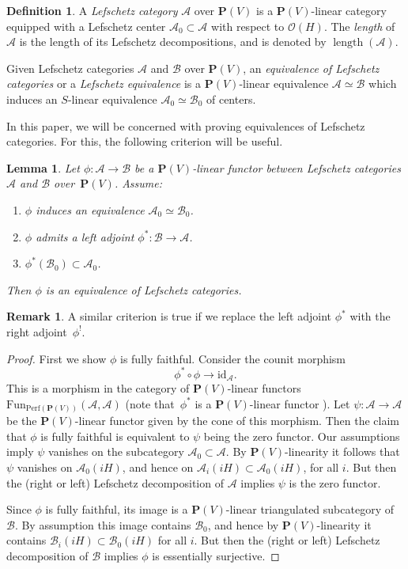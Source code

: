 \documentclass[11pt, reqno]{amsart}
\numberwithin{equation}{section}
\theoremstyle{plain}
\newtheorem{lemma}[theorem]{Lemma}
\theoremstyle{definition}
\newtheorem{definition}[theorem]{Definition}
\newtheorem{remark}[theorem]{Remark}
\newcommand{\Perf}{\mathrm{Perf}}
\newcommand{\Fun}{\mathrm{Fun}}
\DeclareMathOperator{\length}{\mathrm{length}}
\newcommand{\id}{\mathrm{id}}
\newcommand{\cO}{\mathcal{O}}
\newcommand{\cA}{\mathcal{A}}
\newcommand{\cB}{\mathcal{B}}
\newcommand{\bP}{\mathbf{P}}
\begin{document}
\begin{definition} 
\label{definition-lc} 
A \emph{Lefschetz category} $\cA$ over $\bP(V)$ is a 
$\bP(V)$-linear category equipped with a Lefschetz center $\cA_0 \subset \cA$ with respect to $\cO(H)$. 
The \emph{length} of $\cA$ is the length of its Lefschetz decompositions, and 
is denoted by $\length(\cA)$. 

Given Lefschetz categories $\cA$ and $\cB$ over $\bP(V)$, an \emph{equivalence of Lefschetz categories} or a \emph{Lefschetz equivalence}  
is a $\bP(V)$-linear equivalence $\cA \simeq \cB$ which induces an $S$-linear 
equivalence $\cA_0 \simeq \cB_0$ of centers.  
\end{definition}

In this paper, we will be concerned with proving equivalences of Lefschetz categories. 
For this, the following criterion will be useful. 

\begin{lemma}
\label{lemma-equivalence-lef-cat}
Let $\phi \colon \cA \to \cB$ be a $\bP(V)$-linear functor between Lefschetz categories $\cA$ and $\cB$ 
over~$\bP(V)$. 
Assume: 
\begin{enumerate}
\item $\phi$ induces an equivalence $\cA_0 \simeq \cB_0$.
\item $\phi$ admits a left adjoint $\phi^* \colon \cB \to \cA$. 
\item $\phi^*(\cB_0) \subset \cA_0$.
\end{enumerate} 
Then $\phi$ is an equivalence of Lefschetz categories. 
\end{lemma}

\begin{remark}
A similar criterion is true if we replace the left adjoint $\phi^*$ with the right adjoint~$\phi^!$. 
\end{remark} 

\begin{proof}
First we show $\phi$ is fully faithful. 
Consider the counit morphism 
\begin{equation*}
\phi^* \circ \phi \to \id_{\cA} .
\end{equation*}
This is a morphism in the category of $\bP(V)$-linear functors 
$\Fun_{\Perf(\bP(V))}(\cA, \cA)$ (note that~$\phi^*$ is a $\bP(V)$-linear 
functor \cite[Lemma 2.11]{NCHPD}). 
Let $\psi \colon \cA \to \cA$ be the $\bP(V)$-linear functor given by 
the cone of this morphism. 
Then the claim that $\phi$ is fully faithful is equivalent to $\psi$ being 
the zero functor. 
Our assumptions imply $\psi$ vanishes on the subcategory $\cA_0 \subset \cA$. 
By $\bP(V)$-linearity it follows that $\psi$ vanishes on 
$\cA_0(iH)$, and hence on $\cA_i(iH) \subset \cA_0(iH)$, for all $i$. 
But then the (right or left) Lefschetz decomposition of $\cA$ implies  
$\psi$ is the zero functor. 

Since $\phi$ is fully faithful, its image is a $\bP(V)$-linear triangulated subcategory of $\cB$. 
By assumption this image contains $\cB_0$, and hence by $\bP(V)$-linearity it contains $\cB_i(iH) \subset \cB_0(iH)$ for all $i$. 
But then the (right or left) Lefschetz decomposition of $\cB$ implies $\phi$ is essentially surjective. 
\end{proof}
\end{document}
